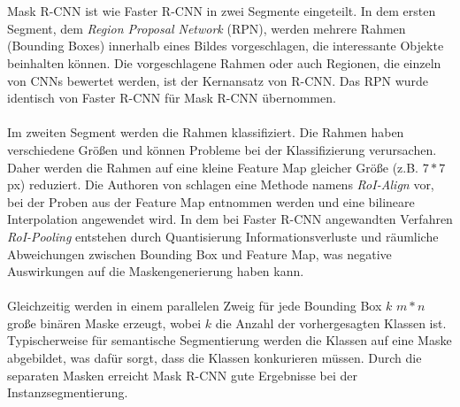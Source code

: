 \\\\
Mask R-CNN ist wie Faster R-CNN in zwei Segmente eingeteilt. In dem ersten Segment, dem \textit{Region Proposal Network} (RPN), werden mehrere Rahmen (Bounding Boxes) innerhalb eines Bildes vorgeschlagen, die interessante Objekte beinhalten können.\cite{ref:faster-r-cnn} Die vorgeschlagene Rahmen oder auch Regionen, die einzeln von CNNs bewertet werden, ist der Kernansatz von R-CNN. Das RPN wurde identisch von Faster R-CNN für Mask R-CNN übernommen.\cite{ref:maskrcnn} 
\\\\
Im zweiten Segment werden die Rahmen klassifiziert. Die Rahmen haben verschiedene Größen und können Probleme bei der Klassifizierung verursachen. Daher werden die Rahmen auf eine kleine Feature Map gleicher Größe (z.B. $7*7$ px) reduziert. Die Authoren von \cite{ref:maskrcnn} schlagen eine Methode namens \textit{RoI-Align} vor, bei der Proben aus der Feature Map entnommen werden und eine bilineare Interpolation angewendet wird. In dem bei Faster R-CNN angewandten Verfahren \textit{RoI-Pooling} entstehen durch Quantisierung Informationsverluste und räumliche Abweichungen zwischen Bounding Box und Feature Map, was negative Auswirkungen auf die Maskengenerierung haben kann. 
\\\\
Gleichzeitig werden in einem parallelen Zweig für jede Bounding Box $k$ $m*n$ große binären Maske erzeugt, wobei $k$ die Anzahl der vorhergesagten Klassen ist. Typischerweise für semantische Segmentierung werden die Klassen auf eine Maske abgebildet, was dafür sorgt, dass die Klassen konkurieren müssen. Durch die separaten Masken erreicht Mask R-CNN gute Ergebnisse bei der Instanzsegmentierung.\cite{ref:maskrcnn}